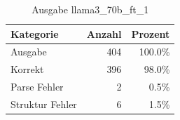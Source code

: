 
\begin{table}[!ht]
\centering
\begin{tabular}{lrr}
\toprule
\textbf{Kategorie} & \textbf{Anzahl} & \textbf{Prozent} \\
\midrule
Ausgabe & 404 & 100.0\% \\
Korrekt & 396 & 98.0\% \\
Parse Fehler & 2 & 0.5\% \\
Struktur Fehler & 6 & 1.5\% \\
\bottomrule
\end{tabular}
\caption{Ausgabe llama3_70b_ft_1}
\label{tab:file_counts}
\end{table}
    